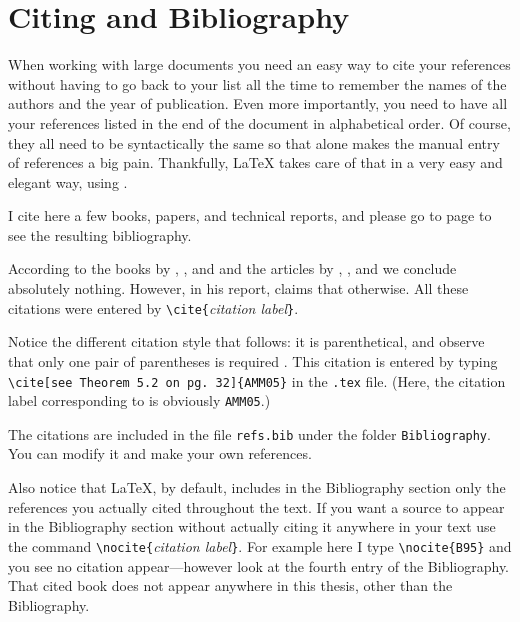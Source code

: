 \section{Citing and Bibliography}
When working with large documents you need an easy way to cite your
references without having to go back to your list all the time to
remember the names of the authors and the year of publication. Even
more importantly, you need to have all your references listed in the
end of the document in alphabetical order. Of course, they all need
to be syntactically the same so that alone makes the manual entry of
references a big pain. Thankfully, \LaTeX{} takes care of that in a
very easy and elegant way, using \BibTeX.

I cite here a few books, papers, and technical reports, and please
go to page \pageref{bib} to see the resulting bibliography.

According to the books by \cite{C75}, \cite{BR02}, and \cite{MR97}
and the articles by \cite{DG01}, \cite{BBM05}, and \cite{CFPS04} we
conclude absolutely nothing. However, in his report, \cite{A04}
claims that otherwise. All these citations were entered by \verb|\cite{|\emph{citation label}\verb|}|.
 
Notice the different citation style that follows: it is parenthetical, and observe that only one pair of parentheses is required \cite[see Theorem 5.2 on pg. 32]{AMM05}. This citation is entered by typing \verb|\cite[see Theorem 5.2 on pg. 32]{AMM05}| in the \verb|.tex| file. (Here, the citation label corresponding to \cite{AMM05} is obviously \verb|AMM05|.)

The citations are included in the file \verb|refs.bib| under the
folder \verb|Bibliography|. You can modify it and make your own
references.

Also notice that \LaTeX{}, by default, includes in the Bibliography section only the references you actually cited throughout the text. If you want a source to appear in the Bibliography section without actually citing it anywhere in your text use the command \verb|\nocite{|\emph{citation label}\verb|}|. For example here I type \verb|\nocite{B95}| \nocite{B95} and you see no citation appear---however look at the fourth entry of the Bibliography. That cited book does not appear anywhere in this thesis, other than the Bibliography.

